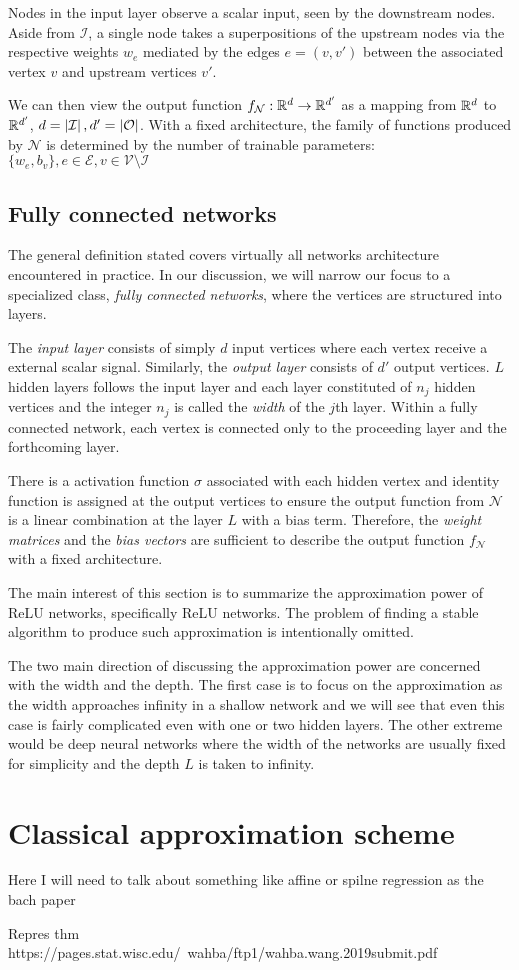 Nodes in the input layer observe a scalar input, seen by the downstream nodes.
Aside from $\mathcal{I}$, a single node takes a superpositions of the upstream
nodes via the respective weights $w_e$ mediated by the edges $e = (v, v')$
between the associated vertex $v$ and upstream vertices $v'$. 

We can then view the output function $f_{\mathcal{N}}: \mathbb{R}^d \to \mathbb{R}^{d'}$ as a
mapping from $\mathbb{R}^d$ to $\mathbb{R}^{d'}$, $d = \left| \mathcal{I} \right|, d' =
\left| \mathcal{O} \right|$. With a fixed architecture, the family of functions produced
by $\mathcal{N}$ is determined by the number of trainable parameters: $\{w_e,
b_v\}, e \in \mathcal{E}, v \in \mathcal{V} \setminus \mathcal{I}$

\subsection{Fully connected networks}

The general definition stated covers virtually all networks architecture
encountered in practice. In our discussion, we will narrow our focus to a
specialized class, \textit{fully connected networks}, where the vertices are
structured into layers.

The \textit{input layer} consists of simply $d$ input vertices where each vertex
receive a external scalar signal. Similarly, the \textit{output layer} consists
of $d'$ output vertices. $L$ hidden layers follows the input layer and each
layer constituted of $n_j$ hidden vertices and the integer $n_j$ is called the
\textit{width} of the $j$th layer. Within a fully connected network, each vertex
is connected only to the proceeding layer and the forthcoming layer.

There is a activation function $\sigma$ associated with each hidden vertex and
identity function is assigned at the output vertices to ensure the output
function from $\mathcal{N}$ is a linear combination at the layer $L$ with a bias
term. Therefore, the \textit{weight matrices} and the \textit{bias vectors} are
sufficient to describe the output function $f_{\mathcal{N}}$ with a fixed
architecture.

The main interest of this section is to summarize the approximation power of
ReLU networks, specifically ReLU networks. The problem of finding a stable
algorithm to produce such approximation is intentionally omitted.

The two main direction of discussing the approximation power are concerned with
the width and the depth. The first case is to focus on the approximation as the
width approaches infinity in a shallow network and we will see that even this
case is fairly complicated even with one or two hidden layers. The other extreme
would be deep neural networks where the width of the networks are usually fixed
for simplicity and the depth $L$ is taken to infinity. 

\section{Classical approximation scheme}

Here I will need to talk about something like affine or spilne regression as the
bach paper

Repres thm https://pages.stat.wisc.edu/~wahba/ftp1/wahba.wang.2019submit.pdf

